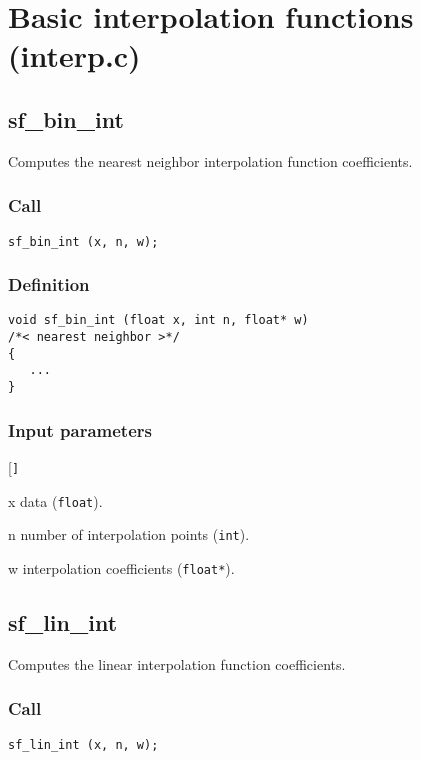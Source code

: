 \section{Basic interpolation functions (interp.c)}




\subsection{{sf\_bin\_int}}
Computes the nearest neighbor interpolation function coefficients.

\subsubsection*{Call}
\begin{verbatim}sf_bin_int (x, n, w);\end{verbatim}

\subsubsection*{Definition}
\begin{verbatim}
void sf_bin_int (float x, int n, float* w) 
/*< nearest neighbor >*/
{
   ...
}
\end{verbatim}

\subsubsection*{Input parameters}
\begin{desclist}{\tt }{\quad}[\tt ]
   \setlength\itemsep{0pt}
   \item[x] data (\texttt{float}).  
   \item[n] number of interpolation points (\texttt{int}).  
   \item[w] interpolation coefficients (\texttt{float*}).  
\end{desclist}




\subsection{{sf\_lin\_int}}
Computes the linear interpolation function coefficients.

\subsubsection*{Call}
\begin{verbatim}sf_lin_int (x, n, w);
\end{verbatim}

